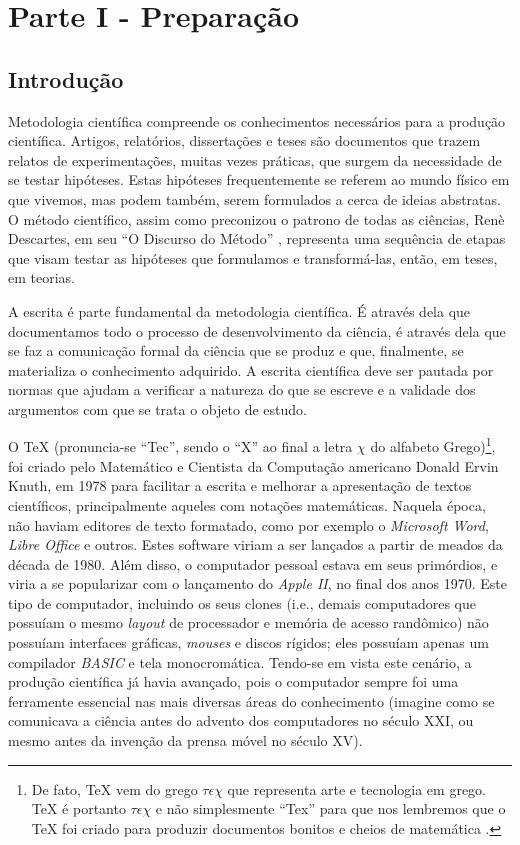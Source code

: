 \chapter{Parte I - Preparação}
\label{cap:parteI}

\section{Introdução}
\label{sec:intro}

Metodologia científica compreende os conhecimentos necessários para a produção científica. Artigos, relatórios, dissertações e teses são documentos que trazem relatos de experimentações, muitas vezes práticas, que surgem da necessidade de se testar hipóteses. Estas hipóteses frequentemente se referem ao mundo físico em que vivemos, mas podem também, serem formulados a cerca de ideias abstratas. O método científico, assim como preconizou o patrono de todas as ciências, Renè Descartes, em seu ``O Discurso do Método'' \cite{descartes}, representa uma sequência de etapas que visam testar as hipóteses que formulamos e transformá-las, então, em teses, em teorias.

A escrita é parte fundamental da metodologia científica. É através dela que documentamos todo o processo de desenvolvimento da ciência, é através dela que se faz a comunicação formal da ciência que se produz e que, finalmente, se materializa o conhecimento adquirido. A escrita científica deve ser pautada por normas que ajudam a verificar a natureza do que se escreve e a validade dos argumentos com que se trata o objeto de estudo.

O \TeX{} (pronuncia-se ``Tec'', sendo o ``X'' ao final a letra $\chi$ do alfabeto Grego)\footnote{De fato, \TeX{} vem do grego $\tau\epsilon\chi$ que representa arte e tecnologia em grego. \TeX{} é portanto $\tau\epsilon\chi$ e não simplesmente ``Tex'' para que nos lembremos que o \TeX{} foi criado para produzir documentos bonitos e cheios de matemática \cite{knuth/1996}.}, foi criado pelo Matemático e Cientista da Computação americano Donald Ervin Knuth, em 1978 para facilitar a escrita e melhorar a apresentação de textos científicos, principalmente aqueles com notações matemáticas. Naquela época, não haviam editores de texto formatado, como por exemplo o \textit{Microsoft Word}, \textit{Libre Office} e outros. Estes software viriam a ser lançados a partir de meados da década de 1980. Além disso, o computador pessoal estava em seus primórdios, e viria a se popularizar com o lançamento do \textit{Apple II}, no final dos anos 1970. Este tipo de computador, incluindo os seus clones (i.e., demais computadores que possuíam o mesmo \textit{layout} de processador e memória de acesso randômico) não possuíam interfaces gráficas, \textit{mouses} e discos rígidos; eles possuíam apenas um compilador \textit{BASIC} e tela monocromática. Tendo-se em vista este cenário, a produção científica já havia avançado, pois o computador sempre foi uma ferramente essencial nas mais diversas áreas do conhecimento (imagine como se comunicava a ciência antes do advento dos computadores no século XXI, ou mesmo antes da invenção da prensa móvel no século XV). 

